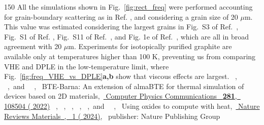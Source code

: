 \documentclass[
prb,
twocolumn,
superscriptaddress,
 amsmath,amssymb,
 aps,
longbibliography,
]{revtex4-2}
\begin{document}
\begin{thebibliography}{150}
  \BibitemOpen
   {All the simulations shown in Fig.~\ref {fig:rect_freq} were performed accounting for grain-boundary scattering as in Ref. \cite {Simoncelli2020}, and considering a grain size of 20 $\mu $m. This value was estimated considering the largest grains in Fig.~S3 of Ref.~\cite {Huberman2019}, Fig.~S1 of Ref. \cite {Jeong2021}, Fig.~S11 of Ref.~\cite {Ding2022}, and Fig. 1e of Ref.~\cite {yuan_modulating_2019}, which are all in broad agreement with 20 $\mu $m.}
  \BibitemOpen
   {Experiments \cite {Ding2022} for isotopically purified graphite are available only at temperatures higher than 100 K, preventing us from comparing VHE and DPLE in the low-temperature limit, where Fig.~\ref {fig:freq_VHE_vs_DPLE}\protect \textbf {a,b} show that viscous effects are largest.}
  \BibitemOpen
   { {~},  {~},\ and\  {~},\ } { {{BTE}-{Barna}: {An} extension of {almaBTE} for thermal simulation of devices based on {2D} materials},\ }\href {https://doi.org/10.1016/j.cpc.2022.108504} { { {Computer Physics Communications}\ }\textbf { {281}},\  {108504} ( {2022}{})}
  \BibitemOpen
   { {\ },  {~},  {~},  {~},  {~},\ and\  {~},\ } { {Using oxides to compute with heat},\ }\href {https://doi.org/10.1038/s41578-024-00690-1} { { {Nature Reviews Materials}\ ,\  {1}} ( {2024})},\  {publisher: Nature Publishing Group}

\end{thebibliography}
\end{document}
